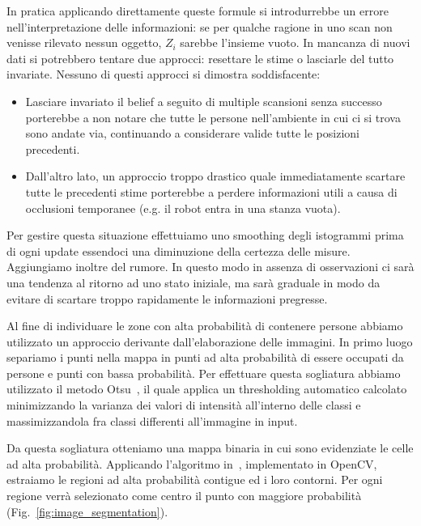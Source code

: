 \documentclass[a4paper]{article}
\begin{document}
	In pratica applicando direttamente queste formule si introdurrebbe un
	errore nell'interpretazione delle informazioni: se per qualche ragione in
	uno scan non venisse rilevato nessun oggetto, $ Z_i $ sarebbe l'insieme
	vuoto. In mancanza di nuovi dati si potrebbero tentare due approcci:
	resettare le stime o lasciarle del tutto invariate. Nessuno di questi
	approcci si dimostra soddisfacente:
	\begin{itemize} 
		\item Lasciare invariato il belief a seguito di multiple scansioni
			senza successo porterebbe a non notare che tutte le persone
			nell'ambiente in cui ci si trova sono andate via, continuando a
			considerare valide tutte le posizioni precedenti.
		\item Dall'altro lato, un approccio troppo drastico quale
			immediatamente scartare tutte le precedenti stime porterebbe a
			perdere informazioni utili a causa di occlusioni temporanee (e.g.
			il robot entra in una stanza vuota).
	\end{itemize}

	Per gestire questa situazione effettuiamo uno smoothing degli istogrammi
	prima di ogni update essendoci una diminuzione della certezza delle misure.
	Aggiungiamo inoltre del rumore. In questo modo in assenza di osservazioni
	ci sarà una tendenza al ritorno ad uno stato iniziale, ma sarà graduale in
	modo da evitare di scartare troppo rapidamente le informazioni pregresse.

	Al fine di individuare le zone con alta probabilità di contenere persone
	abbiamo utilizzato un approccio derivante dall'elaborazione delle immagini.
	In primo luogo separiamo i punti nella mappa in punti ad alta probabilità
	di essere occupati da persone e punti con bassa probabilità. Per effettuare
	questa sogliatura abbiamo utilizzato il metodo Otsu~\cite{otsu}, il quale
	applica un thresholding automatico calcolato minimizzando la varianza dei
	valori di intensità all'interno delle classi e massimizzandola fra classi
	differenti all'immagine in input.  
	
	Da questa sogliatura otteniamo una mappa binaria in cui sono evidenziate le
	celle ad alta probabilità. Applicando l'algoritmo in~\cite{contours},
	implementato in OpenCV, estraiamo le regioni ad alta probabilità contigue
	ed i loro contorni. Per ogni regione verrà selezionato come centro il punto
	con maggiore probabilità (Fig.~\ref{fig:image_segmentation}).
\end{document}
